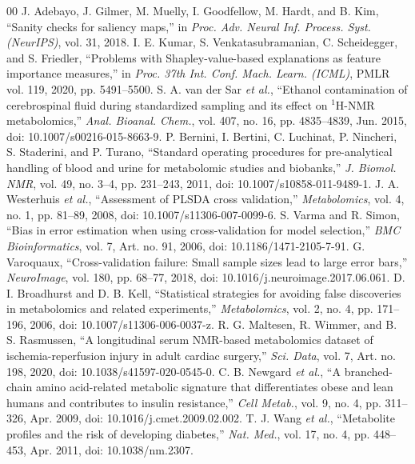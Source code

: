 \documentclass[conference]{IEEEtran}
\begin{document}
\begin{thebibliography}{00}
 J. Adebayo, J. Gilmer, M. Muelly, I. Goodfellow, M. Hardt, and B. Kim, ``Sanity checks for saliency maps,'' in \textit{Proc. Adv. Neural Inf. Process. Syst. (NeurIPS)}, vol. 31, 2018.
 I. E. Kumar, S. Venkatasubramanian, C. Scheidegger, and S. Friedler, ``Problems with Shapley-value-based explanations as feature importance measures,'' in \textit{Proc. 37th Int. Conf. Mach. Learn. (ICML)}, PMLR vol. 119, 2020, pp. 5491--5500.
 S. A. van der Sar \textit{et al.}, ``Ethanol contamination of cerebrospinal fluid during standardized sampling and its effect on $^1$H-NMR metabolomics,'' \textit{Anal. Bioanal. Chem.}, vol. 407, no. 16, pp. 4835--4839, Jun. 2015, doi: 10.1007/s00216-015-8663-9.
 P. Bernini, I. Bertini, C. Luchinat, P. Nincheri, S. Staderini, and P. Turano, ``Standard operating procedures for pre-analytical handling of blood and urine for metabolomic studies and biobanks,'' \textit{J. Biomol. NMR}, vol. 49, no. 3--4, pp. 231--243, 2011, doi: 10.1007/s10858-011-9489-1.
 J. A. Westerhuis \textit{et al.}, ``Assessment of PLSDA cross validation,'' \textit{Metabolomics}, vol. 4, no. 1, pp. 81--89, 2008, doi: 10.1007/s11306-007-0099-6.
 S. Varma and R. Simon, ``Bias in error estimation when using cross-validation for model selection,'' \textit{BMC Bioinformatics}, vol. 7, Art. no. 91, 2006, doi: 10.1186/1471-2105-7-91.
 G. Varoquaux, ``Cross-validation failure: Small sample sizes lead to large error bars,'' \textit{NeuroImage}, vol. 180, pp. 68--77, 2018, doi: 10.1016/j.neuroimage.2017.06.061.
 D. I. Broadhurst and D. B. Kell, ``Statistical strategies for avoiding false discoveries in metabolomics and related experiments,'' \textit{Metabolomics}, vol. 2, no. 4, pp. 171--196, 2006, doi: 10.1007/s11306-006-0037-z.
 R. G. Maltesen, R. Wimmer, and B. S. Rasmussen, ``A longitudinal serum NMR-based metabolomics dataset of ischemia-reperfusion injury in adult cardiac surgery,'' \textit{Sci. Data}, vol. 7, Art. no. 198, 2020, doi: 10.1038/s41597-020-0545-0.
 C. B. Newgard \textit{et al.}, ``A branched-chain amino acid-related metabolic signature that differentiates obese and lean humans and contributes to insulin resistance,'' \textit{Cell Metab.}, vol. 9, no. 4, pp. 311--326, Apr. 2009, doi: 10.1016/j.cmet.2009.02.002.
 T. J. Wang \textit{et al.}, ``Metabolite profiles and the risk of developing diabetes,'' \textit{Nat. Med.}, vol. 17, no. 4, pp. 448--453, Apr. 2011, doi: 10.1038/nm.2307.
\end{thebibliography}
\end{document}
